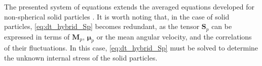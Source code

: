 The presented system of equations extends the averaged equations developed for non-spherical solid particles \citep{curtiss1956kinetic}. 
It is worth noting that, in the case of solid particles, \ref{eq:dt_hybrid_Sp} becomes redundant, as the tensor $\textbf{S}_p$ can be expressed in terms of $\textbf{M}_p$, $\bm{\mu}_p$ or the mean angular velocity, and the correlations of their fluctuations.
In this case, \ref{eq:dt_hybrid_Sp} must be solved to determine the unknown internal stress of the solid particles. 
